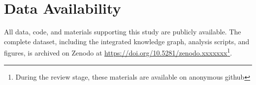 \section*{Data Availability}

All data, code, and materials supporting this study are publicly available.
The complete dataset, including the integrated knowledge graph, analysis scripts,
and figures, is archived on Zenodo at \url{https://doi.org/10.5281/zenodo.xxxxxxx}\footnote{During the review stage, these materials are available on anonymous github}.